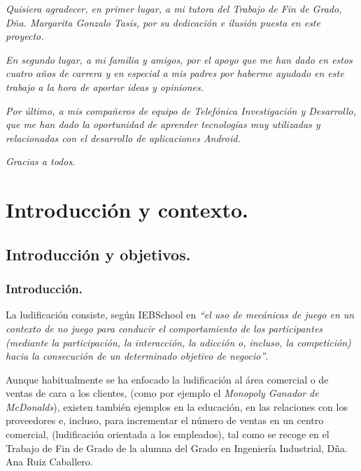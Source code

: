 \documentclass[twoside]{report}
\begin{document}
\begin{flushright}
\textit{Quisiera agradecer, en primer lugar, a mi tutora del Trabajo de Fin de Grado, Dña. Margarita Gonzalo Tasis, por su dedicación e ilusión puesta en este proyecto.} \vspace{0.5cm}

\textit{En segundo lugar, a mi familia y amigos, por el apoyo que me han dado en estos cuatro años de carrera y en especial a mis padres por haberme ayudado en este trabajo a la hora de aportar ideas y opiniones.} \vspace{0.5cm}

\textit{Por último, a mis compañeros de equipo de Telefónica Investigación y Desarrollo, que me han dado la oportunidad de aprender tecnologías muy utilizadas y relacionadas con el desarrollo de aplicaciones Android.} \vspace{0.5cm}

\textit{Gracias a todos.}
\end{flushright}

\newpage
\thispagestyle{empty}
\mbox{}

\clearpage

\tableofcontents

\listoffigures
 
\listoftables

\clearpage



\chapter{Introducción y contexto.}
\section{Introducción y objetivos.}

\subsection{Introducción.}

La ludificación consiste, según IEBSchool \cite{iebschoolGami} en \textit{“el uso de mecánicas de juego en un contexto de no juego para conducir el comportamiento de los participantes (mediante la participación, la interacción, la adicción o, incluso, la competición) hacia la consecución de un determinado objetivo de negocio”}. 

Aunque habitualmente se ha enfocado la ludificación al área comercial o de ventas de cara a los clientes, (como por ejemplo el \cite{monopolymcdo} \textit{Monopoly Ganador de McDonalds}), existen también ejemplos en la educación, en las relaciones con los proveedores e, incluso, para incrementar el número de ventas en un centro comercial, (ludificación orientada a los empleados), tal como se recoge en el Trabajo de Fin de Grado de la alumna del Grado en Ingeniería Industrial, \cite{anatfg} Dña. Ana Ruiz Caballero.
\end{document}
